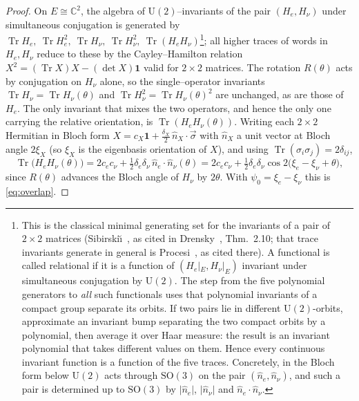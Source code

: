\documentclass[11pt,a4paper]{article}
\theoremstyle{definition}
\newcommand{\He}{H_e}
\newcommand{\Hnu}{H_\nu}
\newcommand{\Tr}{\operatorname{Tr}}
\newcommand{\one}{\mathbf 1}
\begin{document}
\begin{proof}
On $E\cong\mathbb C^2$, the algebra of $\mathrm U(2)$--invariants of the pair
$(\He,\Hnu)$ under simultaneous conjugation is generated by
$\Tr\He,\ \Tr\He^2,\ \Tr\Hnu,\ \Tr\Hnu^2,\ \Tr(\He\Hnu)$\footnote{This is the classical
minimal generating set for the invariants of a pair of $2\times2$ matrices
(Sibirski\u{\i}~\cite{sibirskii1968}, as cited in Drensky~\cite{drensky2005}, Thm.~2.10; that
trace invariants generate in general is Procesi~\cite{procesi1976}, as cited there). A functional is
called relational if it is a function of $(\He|_E,\Hnu|_E)$ invariant under simultaneous conjugation
by $\mathrm U(2)$. The step from the five polynomial generators to \emph{all} such functionals uses
that polynomial invariants of a compact group separate its orbits. If two pairs lie in different
$\mathrm U(2)$-orbits, approximate an invariant bump separating the two compact orbits by a
polynomial, then average it over Haar measure: the result is an invariant polynomial that takes
different values on them. Hence every continuous invariant function is a function of the five
traces. Concretely, in the Bloch form below $\mathrm U(2)$ acts through $\mathrm{SO}(3)$ on the pair
$(\hat n_e,\hat n_\nu)$, and such a pair is determined up to $\mathrm{SO}(3)$ by
$\lvert\hat n_e\rvert$, $\lvert\hat n_\nu\rvert$ and $\hat n_e\!\cdot\!\hat n_\nu$.}; all higher traces of
words in $\He,\Hnu$ reduce to these by the Cayley--Hamilton relation
$X^2=(\Tr X)X-(\det X)\one$ valid for $2\times2$ matrices. The rotation $R(\theta)$
acts by conjugation on $\Hnu$ alone, so the single--operator invariants
$\Tr\Hnu=\Tr\Hnu(\theta)$ and $\Tr\Hnu^2=\Tr\Hnu(\theta)^2$ are unchanged, as are
those of $\He$. The only invariant that mixes the two operators, and hence the only
one carrying the relative orientation, is $\Tr(\He\Hnu(\theta))$. Writing each
$2\times2$ Hermitian in Bloch form
$X=c_X\one+\tfrac{\delta_X}{2}\,\hat n_X\!\cdot\!\vec\sigma$ with $\hat n_X$ a unit
vector at Bloch angle $2\xi_X$ (so $\xi_X$ is the eigenbasis orientation of $X$),
and using $\Tr(\sigma_i\sigma_j)=2\delta_{ij}$,
\begin{equation}
  \Tr\!\bigl(\He\Hnu(\theta)\bigr)
  = 2c_ec_\nu+\tfrac12\delta_e\delta_\nu\,\hat n_e\!\cdot\!\hat n_\nu(\theta)
  = 2c_ec_\nu+\tfrac12\delta_e\delta_\nu\cos 2\bigl(\xi_e-\xi_\nu+\theta\bigr),
\end{equation}
since $R(\theta)$ advances the Bloch angle of $\Hnu$ by $2\theta$. With
$\psi_0=\xi_e-\xi_\nu$ this is \eqref{eq:overlap}.
\end{proof}
\end{document}
